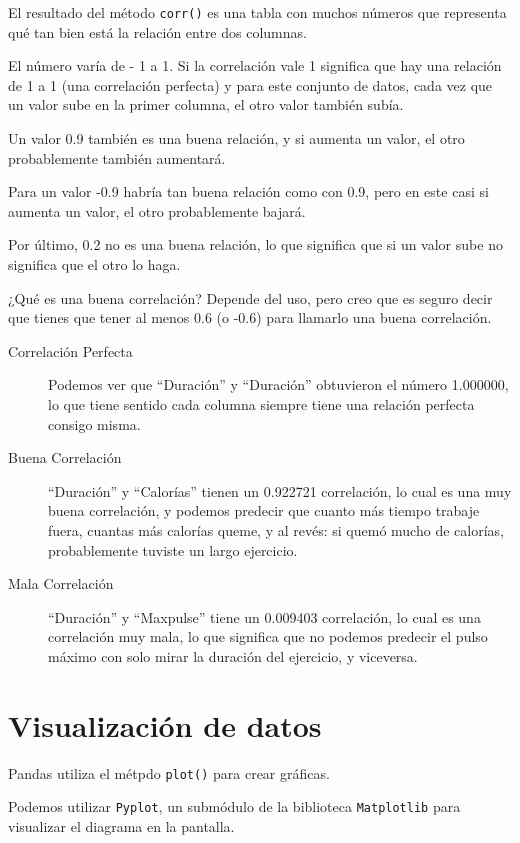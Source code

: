 El resultado del método \texttt{corr()} es una tabla con muchos números
que representa qué tan bien está la relación entre dos columnas.

El número varía de - 1 a 1. Si la correlación vale 1 significa que hay
una relación de 1 a 1 (una correlación perfecta) y para este conjunto de
datos, cada vez que un valor sube en la primer columna, el otro valor
también subía.

Un valor 0.9 también es una buena relación, y si aumenta un valor, el
otro probablemente también aumentará.

Para un valor -0.9 habría tan buena relación como con 0.9, pero en este
casi si aumenta un valor, el otro probablemente bajará.

Por último, 0.2 no es una buena relación, lo que significa que si un
valor sube no significa que el otro lo haga.

¿Qué es una buena correlación? Depende del uso, pero creo que es seguro
decir que tienes que tener al menos 0.6 (o -0.6) para llamarlo una buena
correlación.

\begin{description}
  \item[Correlación Perfecta] Podemos ver que ``Duración'' y ``Duración'' obtuvieron el número 1.000000,
    lo que tiene sentido cada columna siempre tiene una relación perfecta consigo misma.
  \item[Buena Correlación] ``Duración'' y ``Calorías'' tienen un 0.922721 correlación, lo cual es una
    muy buena correlación, y podemos predecir que cuanto más tiempo trabaje
    fuera, cuantas más calorías queme, y al revés: si quemó mucho de
calorías, probablemente tuviste un largo ejercicio.
  \item[Mala Correlación] ``Duración'' y ``Maxpulse'' tiene un 0.009403 correlación, lo cual es una
    correlación muy mala, lo que significa que no podemos predecir el pulso
    máximo con solo mirar la duración del ejercicio, y viceversa.

\end{description}

\section{Visualización de datos}

Pandas utiliza el métpdo \texttt{plot()} para crear gráficas. 

Podemos utilizar \texttt{Pyplot}, un submódulo de la biblioteca \texttt{Matplotlib} para visualizar el diagrama en la pantalla.\\

